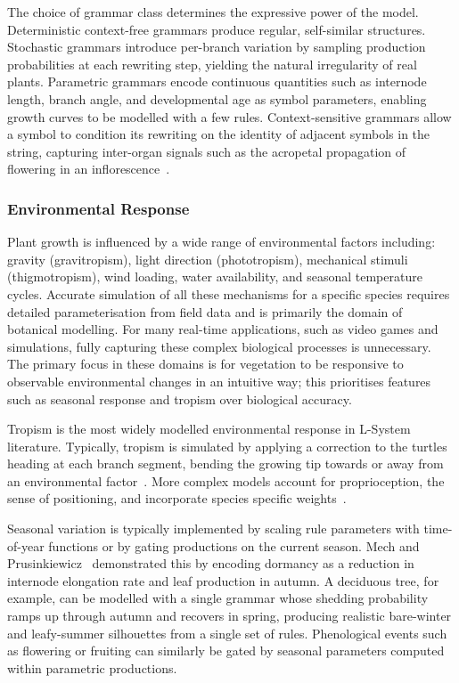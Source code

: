 \medskip
The choice of grammar class determines the expressive power of the model. Deterministic context-free grammars
produce regular, self-similar structures. Stochastic grammars introduce per-branch variation by sampling
production probabilities at each rewriting step, yielding the natural irregularity of real plants. Parametric
grammars encode continuous quantities such as internode length, branch angle, and developmental age as symbol
parameters, enabling growth curves to be modelled with a few rules. Context-sensitive grammars allow a symbol
to condition its rewriting on the identity of adjacent symbols in the string, capturing inter-organ signals
such as the acropetal propagation of flowering in an inflorescence~\cite{prusinkiewiczAlgorithmicBeautyPlants1990}.

\subsubsection{Environmental Response}

Plant growth is influenced by a wide range of environmental factors including: gravity (gravitropism), light
direction (phototropism), mechanical stimuli (thigmotropism), wind loading, water availability, and seasonal
temperature cycles. Accurate simulation of all these mechanisms for a specific species requires detailed
parameterisation from field data and is primarily the domain of botanical modelling. For many real-time
applications, such as video games and simulations, fully capturing these complex biological processes is
unnecessary. The primary focus in these domains is for vegetation to be responsive to observable
environmental changes in an intuitive way; this prioritises features such as seasonal response and tropism
over biological accuracy.

\medskip
Tropism is the most widely modelled environmental response in L-System literature. Typically, tropism is
simulated by applying a correction to the turtles heading at each branch segment, bending the growing tip
towards or away from an environmental factor~\cite{prusinkiewiczAlgorithmicBeautyPlants1990}. More complex
models account for proprioception, the sense of positioning, and incorporate species specific
weights~\cite{bastienUnifiedModelShoot2015}.

\medskip
Seasonal variation is typically implemented by scaling rule parameters with time-of-year functions or by
gating productions on the current season. Mech and Prusinkiewicz~\cite{mechVisualModelsPlants1996}
demonstrated this by encoding dormancy as a reduction in internode elongation rate and leaf production in
autumn. A deciduous tree, for example, can be modelled with a single grammar whose shedding probability ramps
up through autumn and recovers in spring, producing realistic bare-winter and leafy-summer silhouettes from a
single set of rules. Phenological events such as flowering or fruiting can similarly be gated by seasonal
parameters computed within parametric productions.

